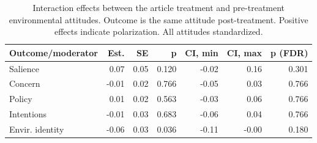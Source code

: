 \begin{table}[h!t]
\centering
\begin{tabular}{lrrrrrr}
  \hline
Outcome/moderator & Est. & SE & p & CI, min & CI, max & p (FDR) \\ 
  \hline
Salience & 0.07 & 0.05 & 0.120 & -0.02 & 0.16 & 0.301 \\ 
  Concern & -0.01 & 0.02 & 0.766 & -0.05 & 0.03 & 0.766 \\ 
  Policy & 0.01 & 0.02 & 0.563 & -0.03 & 0.06 & 0.766 \\ 
  Intentions & -0.01 & 0.03 & 0.683 & -0.06 & 0.04 & 0.766 \\ 
  Envir. identity & -0.06 & 0.03 & 0.036 & -0.11 & -0.00 & 0.180 \\ 
   \hline
\end{tabular}
\caption{Interaction effects between the article treatment and pre-treatment environmental attitudes.
                   Outcome is the same attitude post-treatment. Positive effects indicate polarization. All attitudes
                   standardized.} 
\label{tab:main_polarize}
\end{table}

